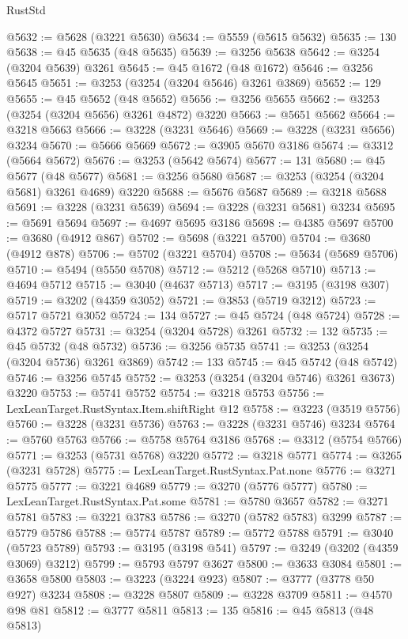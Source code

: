 \begin{lexlean}{RustStd}
\begin{coremodule}
@5632 := @5628 (@3221 @5630)
@5634 := @5559 (@5615 @5632)
@5635 := 130
@5638 := @45 @5635 (@48 @5635)
@5639 := @3256 @5638
@5642 := @3254 (@3204 @5639) @3261
@5645 := @45 @1672 (@48 @1672)
@5646 := @3256 @5645
@5651 := @3253 (@3254 (@3204 @5646) @3261 @3869)
@5652 := 129
@5655 := @45 @5652 (@48 @5652)
@5656 := @3256 @5655
@5662 := @3253 (@3254 (@3204 @5656) @3261 @4872) @3220
@5663 := @5651 @5662
@5664 := @3218 @5663
@5666 := @3228 (@3231 @5646)
@5669 := @3228 (@3231 @5656) @3234
@5670 := @5666 @5669
@5672 := @3905 @5670 @3186
@5674 := @3312 (@5664 @5672)
@5676 := @3253 (@5642 @5674)
@5677 := 131
@5680 := @45 @5677 (@48 @5677)
@5681 := @3256 @5680
@5687 := @3253 (@3254 (@3204 @5681) @3261 @4689) @3220
@5688 := @5676 @5687
@5689 := @3218 @5688
@5691 := @3228 (@3231 @5639)
@5694 := @3228 (@3231 @5681) @3234
@5695 := @5691 @5694
@5697 := @4697 @5695 @3186
@5698 := @4385 @5697
@5700 := @3680 (@4912 @867)
@5702 := @5698 (@3221 @5700)
@5704 := @3680 (@4912 @878)
@5706 := @5702 (@3221 @5704)
@5708 := @5634 (@5689 @5706)
@5710 := @5494 (@5550 @5708)
@5712 := @5212 (@5268 @5710)
@5713 := @4694 @5712
@5715 := @3040 (@4637 @5713)
@5717 := @3195 (@3198 @307)
@5719 := @3202 (@4359 @3052)
@5721 := @3853 (@5719 @3212)
@5723 := @5717 @5721 @3052
@5724 := 134
@5727 := @45 @5724 (@48 @5724)
@5728 := @4372 @5727
@5731 := @3254 (@3204 @5728) @3261
@5732 := 132
@5735 := @45 @5732 (@48 @5732)
@5736 := @3256 @5735
@5741 := @3253 (@3254 (@3204 @5736) @3261 @3869)
@5742 := 133
@5745 := @45 @5742 (@48 @5742)
@5746 := @3256 @5745
@5752 := @3253 (@3254 (@3204 @5746) @3261 @3673) @3220
@5753 := @5741 @5752
@5754 := @3218 @5753
@5756 := LexLeanTarget.RustSyntax.Item.shiftRight @12
@5758 := @3223 (@3519 @5756)
@5760 := @3228 (@3231 @5736)
@5763 := @3228 (@3231 @5746) @3234
@5764 := @5760 @5763
@5766 := @5758 @5764 @3186
@5768 := @3312 (@5754 @5766)
@5771 := @3253 (@5731 @5768) @3220
@5772 := @3218 @5771
@5774 := @3265 (@3231 @5728)
@5775 := LexLeanTarget.RustSyntax.Pat.none
@5776 := @3271 @5775
@5777 := @3221 @4689
@5779 := @3270 (@5776 @5777)
@5780 := LexLeanTarget.RustSyntax.Pat.some
@5781 := @5780 @3657
@5782 := @3271 @5781
@5783 := @3221 @3783
@5786 := @3270 (@5782 @5783) @3299
@5787 := @5779 @5786
@5788 := @5774 @5787
@5789 := @5772 @5788
@5791 := @3040 (@5723 @5789)
@5793 := @3195 (@3198 @541)
@5797 := @3249 (@3202 (@4359 @3069) @3212)
@5799 := @5793 @5797 @3627
@5800 := @3633 @3084
@5801 := @3658 @5800
@5803 := @3223 (@3224 @923)
@5807 := @3777 (@3778 @50 @927) @3234
@5808 := @3228 @5807
@5809 := @3228 @3709
@5811 := @4570 @98 @81
@5812 := @3777 @5811
@5813 := 135
@5816 := @45 @5813 (@48 @5813)

\end{coremodule}
\end{lexlean}
